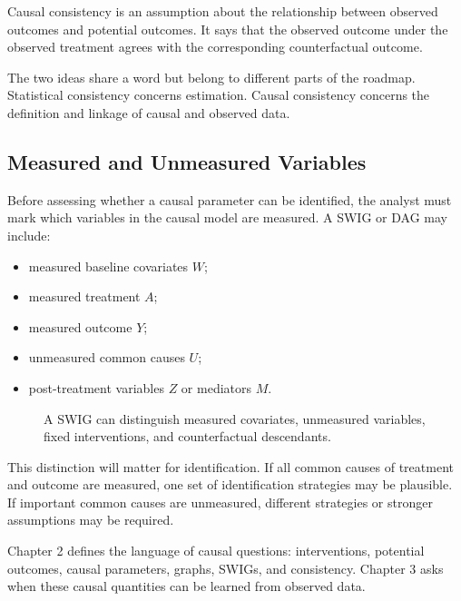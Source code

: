 Causal consistency is an assumption about the relationship between observed outcomes and potential outcomes. It says that the observed outcome under the observed treatment agrees with the corresponding counterfactual outcome.

The two ideas share a word but belong to different parts of the roadmap. Statistical consistency concerns estimation. Causal consistency concerns the definition and linkage of causal and observed data.

\subsection{Measured and Unmeasured Variables}

Before assessing whether a causal parameter can be identified, the analyst must mark which variables in the causal model are measured. A SWIG or DAG may include:
\begin{itemize}
  \item measured baseline covariates $W$;
  \item measured treatment $A$;
  \item measured outcome $Y$;
  \item unmeasured common causes $U$;
  \item post-treatment variables $Z$ or mediators $M$.
\end{itemize}

\begin{figure}[H]
\centering
{}
\caption{A SWIG can distinguish measured covariates, unmeasured variables, fixed interventions, and counterfactual descendants.}
\end{figure}

This distinction will matter for identification. If all common causes of treatment and outcome are measured, one set of identification strategies may be plausible. If important common causes are unmeasured, different strategies or stronger assumptions may be required.

\begin{keyidea}
Chapter 2 defines the language of causal questions: interventions, potential outcomes, causal parameters, graphs, SWIGs, and consistency. Chapter 3 asks when these causal quantities can be learned from observed data.
\end{keyidea}

